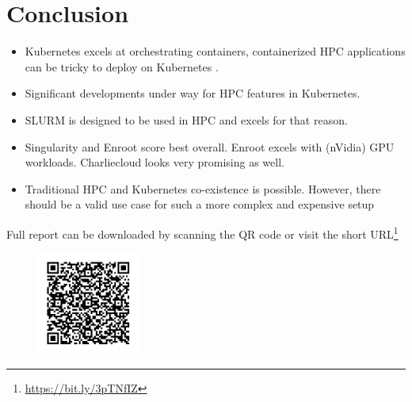 \documentclass[hyperref={pdfpagelabels=false},aspectratio=169]{beamer}
\begin{document}
    \section{Conclusion} 
    \begin{frame}
        \begin{itemize}
          \item Kubernetes excels at orchestrating containers, containerized HPC applications can be tricky to deploy on Kubernetes .
          \item Significant developments under way for HPC features in Kubernetes.
          \item SLURM is designed to be used in HPC and excels for that reason.
          \item Singularity and Enroot score best overall. Enroot excels with (nVidia) GPU workloads. Charliecloud looks very promising as well.
          \item Traditional HPC and Kubernetes co-existence is possible. However, there should be a valid use case for such a more complex and expensive setup 
        \end{itemize}
    \end{frame}
    \begin{frame}
    Full report can be downloaded by scanning the QR code or visit the short URL\footnote{\url{https://bit.ly/3pTNfIZ}}
      \begin{figure}[H]
      \centering
      \includegraphics[width=0.3\textwidth]{images/frame.png}
      \label{fig:kube_vs_slurm}
    \end{figure}
    \end{frame}
\end{document}
